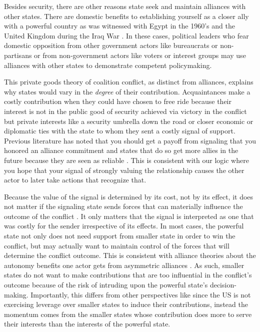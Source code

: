 \documentclass[12pt,letterpaper]{article}
\begin{document}
		Besides security, there are other reasons state seek and maintain alliances with other states. There are domestic benefits to establishing yourself as a closer ally with a powerful country as was witnessed with Egypt in the 1960's \citep{barnett_domesticsourcesalliances_1991} and the United Kingdom during the Iraq War \citep{davidson_americaallieswar_2011}. In these cases, political leaders who fear domestic opposition from other government actors like bureaucrats or non-partisans or from non-government actors like voters or interest groups may use alliances with other states to demonstrate competent policymaking.

		This private goods theory of coalition conflict, as distinct from alliances, explains why states would vary in the \textit{degree} of their contribution. Acquaintances make a costly contribution when they could have chosen to free ride because their interest is not in the public good of security achieved via victory in the conflict but private interests like a security umbrella down the road or closer economic or diplomatic ties with the state to whom they sent a costly signal of support. Previous literature has noted that you should get a payoff from signaling that you honored an alliance commitment and states that do so get more allies in the future because they are seen as reliable \citep{gibler_costsrenegingreputation_2008}. This is consistent with our logic where you hope that your signal of strongly valuing the relationship causes the other actor to later take actions that recognize that.

		Because the value of the signal is determined by its cost, not by its effect, it does not matter if the signaling state sends forces that can materially influence the outcome of the conflict \citep{davidson_americaallieswar_2011}. It only matters that the signal is interpreted as one that was costly for the sender irrespective of its effects. In most cases, the powerful state not only does not need support from smaller state in order to win the conflict, but may actually want to maintain control of the forces that will determine the conflict outcome. This is consistent with alliance theories about the autonomy benefits one actor gets from asymmetric alliances \citep{morrow_alliancesasymmetryalternative_1991}. As such, smaller states do not want to make contributions that are too influential in the conflict's outcome because of the risk of intruding upon the powerful state's decision-making. Importantly, this differs from other perspectives like \citet{bennett_burdensharingpersiangulf_1994} since the US is not exercising leverage over smaller states to induce their contributions, instead the momentum comes from the smaller states whose contribution does more to serve their interests than the interests of the powerful state.
\end{document}
